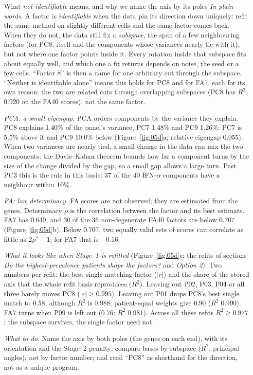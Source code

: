 \begin{explainbox}{What \emph{not identifiable} means, and why we name the axis by its poles}
\emph{In plain words.} A factor is \emph{identifiable} when the data pin its direction down uniquely: refit the same method on slightly different cells and the same factor comes back. When they do not, the data still fix a \emph{subspace}, the span of a few neighbouring factors (for PC8, itself and the components whose variances nearly tie with it), but not where one factor points inside it. Every rotation inside that subspace fits about equally well, and which one a fit returns depends on noise, the seed or a few cells. ``Factor 8'' is then a name for one arbitrary cut through the subspace. ``Neither is identifiable alone'' means this holds for PC8 and for FA7, each for its own reason; the two are related cuts through overlapping subspaces (PC8 has $R^2$ 0.920 on the FA40 scores), not the same factor.

\emph{PCA: a small eigengap.} PCA orders components by the variance they explain. PC8 explains 1.40\% of the panel's variance, PC7 1.48\% and PC9 1.26\%: PC7 is 5.5\% above it and PC9 10.0\% below (Figure~\ref{fig:05d}a; relative eigengap 0.055). When two variances are nearly tied, a small change in the data can mix the two components; the Davis--Kahan theorem bounds how far a component turns by the size of the change divided by the gap, so a small gap allows a large turn. Past PC3 this is the rule in this basis: 37 of the 40 IFN-$\alpha$ components have a neighbour within 10\%.

\emph{FA: low determinacy.} FA scores are not observed; they are estimated from the genes. Determinacy $\rho$ is the correlation between the factor and its best estimate. FA7 has 0.649, and 30 of the 36 non-degenerate FA40 factors are below 0.707 (Figure~\ref{fig:05d}b). Below 0.707, two equally valid sets of scores can correlate as little as $2\rho^2-1$; for FA7 that is $-0.16$.

\emph{What it looks like when Stage~1 is refitted} (Figure~\ref{fig:05d}c; the refits of sections \emph{Do the highest-prevalence patients shape the factors?} and \emph{Option 2}). Two numbers per refit: the best single matching factor ($|r|$) and the share of the stored axis that the whole refit basis reproduces ($R^2$). Leaving out P02, P03, P04 or all three barely moves PC8 ($|r| \geq 0.995$). Leaving out P01 drops PC8's best single match to 0.58, although $R^2$ is 0.988; patient-equal weights give 0.90 ($R^2$ 0.990). FA7 turns when P09 is left out (0.76; $R^2$ 0.981). Across all these refits $R^2 \geq 0.977$: the subspace survives, the single factor need not.

\emph{What to do.} Name the axis by both poles (the genes on each end), with its orientation and the Stage~2 penalty; compare bases by subspace ($R^2$, principal angles), not by factor number; and read ``PC8'' as shorthand for the direction, not as a unique program.
\end{explainbox}

